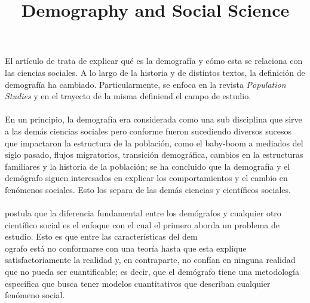 \documentclass[11pt,spanish,letterpaper]{article}
\theoremstyle{plain}
\begin{document}
\title{Demography and Social Science}
\date{}
\maketitle
El art\'iculo de \cite{caldwell1996demography} trata de explicar qu\'e es la demograf\'ia y c\'omo esta se relaciona con las ciencias sociales. A lo largo de la historia y de distintos textos, la definici\'on de demograf\'ia ha cambiado. Particularmente, se enfoca en la revista \textit{Population Studies} y en el trayecto de la misma definiend el campo de estudio.\\%
\\
En un principio, la demograf\'ia era considerada como una sub disciplina que sirve a las dem\'as ciencias sociales pero conforme fueron sucediendo diversos sucesos que impactaron la estructura de la poblaci\'on, como el baby-boom a mediados del siglo pasado, flujos migratorios, transici\'on demogr\'afica, cambios en la estructuras familiares y la historia de la poblaci\'on; se ha concluido que la demograf\'ia y el dem\'ografo siguen interesados en explicar los comportamientos y el cambio en fen\'omenos sociales. Esto los separa de las dem\'as ciencias y cient\'ificos sociales.\\
\\
\cite{caldwell1996demography} postula que la diferencia fundamental entre los dem\'ografos y cualquier otro cient\'ifico social es el enfoque con el cual el primero aborda un problema de estudio. Esto es que entre las caracter\'isticas del dem\\ografo est\'a no conformarse con una teor\'ia hasta que esta explique satisfactoriamente la realidad y, en contraparte, no conf\'ian en ninguna realidad que no pueda ser cuantificable; es decir, que el dem\'ografo tiene una metodolog\'ia espec\'ifica que busca tener modelos cuantitativos que describan cualquier fen\'omeno social.\\
\end{document}
